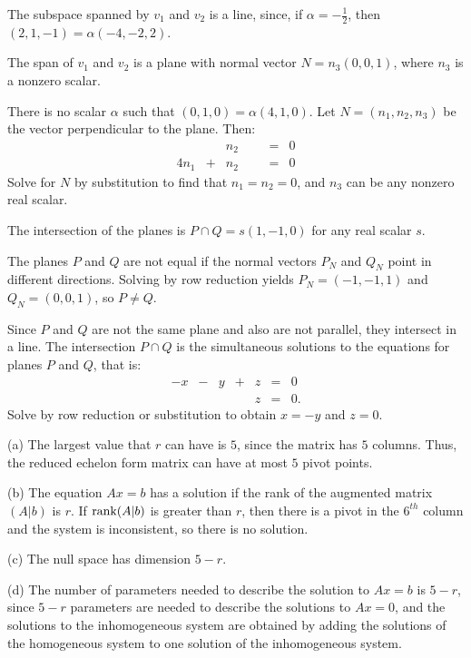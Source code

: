 \documentclass{ximera}
\begin{document}
 \ans The subspace spanned by $v_1$ and $v_2$ is a line,
since, if $\alpha = -\frac{1}{2}$, then $(2,1,-1) = \alpha(-4,-2,2)$.

 \ans The span of $v_1$ and $v_2$ is a plane with normal
vector $N = n_3(0,0,1)$, where $n_3$ is a nonzero scalar.

\soln There is no scalar $\alpha$ such that $(0,1,0) = \alpha(4,1,0)$. 
Let $N = (n_1,n_2,n_3)$ be the vector perpendicular to the plane.  Then:
\[
\begin{array}{rrrrrcl}
& & n_2 & & & = & 0 \\
4n_1 & + & n_2 & & & = & 0 \end{array}
\]
Solve for $N$ by substitution to find that $n_1 = n_2 = 0$, and
$n_3$ can be any nonzero real scalar.

\ans The intersection of the planes is $P \cap Q = s(1,-1,0)$ for any
real scalar $s$.

\soln The planes $P$ and $Q$ are not equal if the normal vectors $P_N$
and $Q_N$ point in different directions.  Solving by row reduction
yields $P_N = (-1,-1,1)$ and $Q_N = (0,0,1)$, so $P \neq Q$.

\para Since $P$ and $Q$ are not the same plane and also are not
parallel, they intersect in a line.  The intersection $P \cap Q$ is
the simultaneous solutions to the equations for planes $P$ and $Q$,
that is:
\[ \begin{array}{rrrrrrl}
-x & - & y & + & z & = & 0 \\
& & & & z & = & 0. \end{array} \]
Solve by row reduction or substitution to obtain $x = -y$ and $z = 0$.

(a) The largest value that $r$ can have is $5$, since the matrix has
$5$ columns.  Thus, the reduced echelon form matrix can have at most
$5$ pivot points.

(b) The equation $Ax = b$ has a solution if the rank of the augmented
matrix $(A|b)$ is $r$.  If ${\rm rank} (A|b)$ is greater than $r$, then
there is a pivot in the $6^{th}$ column and the system is
inconsistent, so there is no solution.

(c) The null space has dimension $5 - r$.

(d) The number of parameters needed to describe the solution to
$Ax = b$ is $5 - r$, since $5 - r$ parameters are needed to describe
the solutions to $Ax = 0$, and the solutions to the inhomogeneous
system are obtained by adding the solutions of the homogeneous system
to one solution of the inhomogeneous system.
\end{document}
